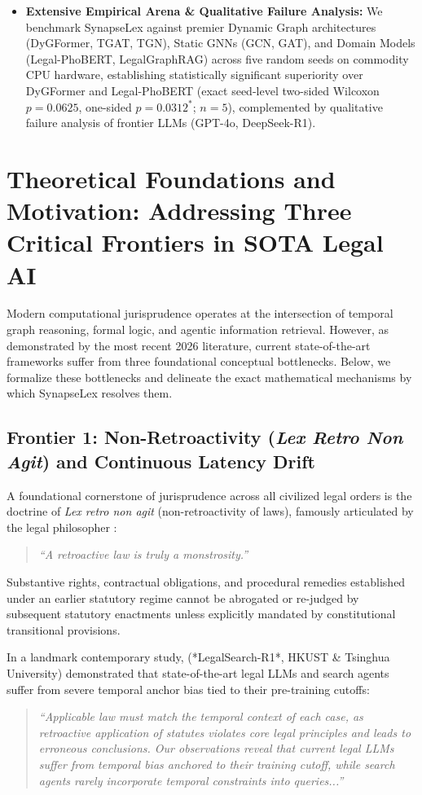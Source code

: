 \documentclass[11pt,a4paper]{article}
\begin{document}
\begin{itemize}[leftmargin=*]
    \item \textbf{Extensive Empirical Arena \& Qualitative Failure Analysis:} We benchmark SynapseLex against premier Dynamic Graph architectures (DyGFormer, TGAT, TGN), Static GNNs (GCN, GAT), and Domain Models (Legal-PhoBERT, LegalGraphRAG) across five random seeds on commodity CPU hardware, establishing statistically significant superiority over DyGFormer and Legal-PhoBERT (exact seed-level two-sided Wilcoxon $p = 0.0625$, one-sided $p = 0.0312^*$; $n=5$), complemented by qualitative failure analysis of frontier LLMs (GPT-4o, DeepSeek-R1).
\end{itemize}

\section{Theoretical Foundations and Motivation: Addressing Three Critical Frontiers in SOTA Legal AI}
\label{sec:theoretical_frontiers}
Modern computational jurisprudence operates at the intersection of temporal graph reasoning, formal logic, and agentic information retrieval. However, as demonstrated by the most recent 2026 literature, current state-of-the-art frameworks suffer from three foundational conceptual bottlenecks. Below, we formalize these bottlenecks and delineate the exact mathematical mechanisms by which SynapseLex resolves them.

\subsection{Frontier 1: Non-Retroactivity (\textit{Lex Retro Non Agit}) and Continuous Latency Drift}
A foundational cornerstone of jurisprudence across all civilized legal orders is the doctrine of \textit{Lex retro non agit} (non-retroactivity of laws), famously articulated by the legal philosopher \citet{fuller1969morality}:
\begin{quote}
\textit{``A retroactive law is truly a monstrosity.''}
\end{quote}
Substantive rights, contractual obligations, and procedural remedies established under an earlier statutory regime cannot be abrogated or re-judged by subsequent statutory enactments unless explicitly mandated by constitutional transitional provisions.

In a landmark contemporary study, \citet{fan2026legalsearch} (*LegalSearch-R1*, HKUST \& Tsinghua University) demonstrated that state-of-the-art legal LLMs and search agents suffer from severe temporal anchor bias tied to their pre-training cutoffs:
\begin{quote}
\textit{``Applicable law must match the temporal context of each case, as retroactive application of statutes violates core legal principles and leads to erroneous conclusions. Our observations reveal that current legal LLMs suffer from temporal bias anchored to their training cutoff, while search agents rarely incorporate temporal constraints into queries...''} \citep[p.~1]{fan2026legalsearch}
\end{quote}
\end{document}
